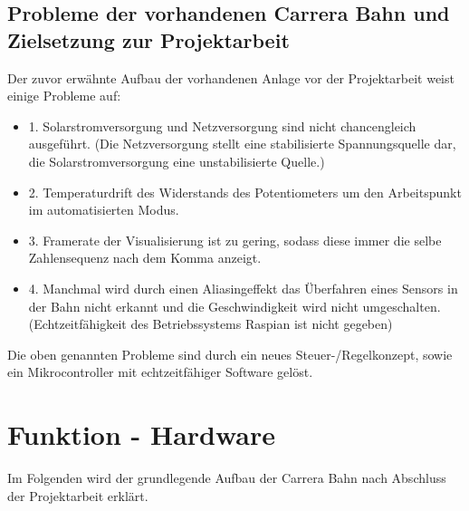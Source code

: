 \documentclass[a4paper, 11pt]{report}
\begin{document}
\section{Probleme der vorhandenen Carrera Bahn und Zielsetzung zur Projektarbeit}
Der zuvor erwähnte Aufbau der vorhandenen Anlage vor der Projektarbeit weist einige Probleme auf:
\begin{itemize}
	\item{1.} Solarstromversorgung und Netzversorgung sind nicht chancengleich ausgeführt. (Die Netzversorgung stellt eine stabilisierte Spannungsquelle dar, die Solarstromversorgung eine unstabilisierte Quelle.)
	\item{2.} Temperaturdrift des Widerstands des Potentiometers um den Arbeitspunkt im automatisierten Modus.
	\item{3.} Framerate der Visualisierung ist zu gering, sodass diese immer die selbe Zahlensequenz nach dem Komma anzeigt.
	\item{4.} Manchmal wird durch einen Aliasingeffekt das Überfahren eines Sensors in der Bahn nicht erkannt und die Geschwindigkeit wird nicht umgeschalten. (Echtzeitfähigkeit des Betriebssystems Raspian ist nicht gegeben)
\end{itemize}
Die oben genannten Probleme sind durch ein neues Steuer-/Regelkonzept, sowie ein Mikrocontroller mit echtzeitfähiger Software gelöst.


\chapter{Funktion - Hardware}
	Im Folgenden wird der grundlegende Aufbau der Carrera Bahn nach Abschluss der Projektarbeit erklärt.
\end{document}
